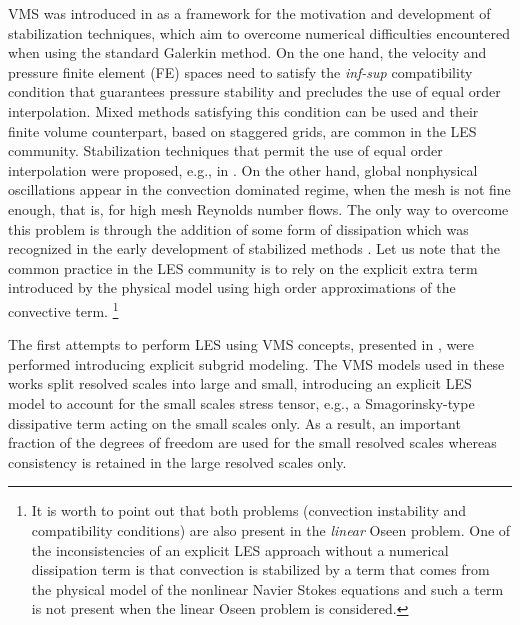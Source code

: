 VMS was introduced in \cite{hughes_multiscale_1995,hughes_variational_1998} as a framework for the motivation and development of stabilization techniques, which aim to overcome numerical difficulties encountered when using the standard Galerkin method. On the one hand, the velocity and pressure finite element (FE) spaces need to satisfy the \textit{inf-sup} compatibility condition that guarantees pressure stability and precludes the use of equal order interpolation. Mixed methods satisfying this condition can be used and their finite volume counterpart, based on staggered grids, are common in the LES community. Stabilization techniques that permit the use of equal order interpolation were proposed, e.g., in \cite{douglas_absolutely_1989,hughes_new_1986}. %
On the other hand, global nonphysical oscillations appear in the convection dominated regime, when the mesh is not fine enough, that is, for high mesh Reynolds number flows. The only way to overcome this problem is through the addition of some form of dissipation which was recognized in the early development of stabilized methods \cite{brooks_streamline_1982}. Let us note that  the common practice in the LES community is to rely on the explicit extra term introduced by the physical model using high order approximations of the convective term.
\footnote{It is worth to point out that both problems (convection instability and compatibility conditions) are also present in the \textit{linear} Oseen problem. One of the inconsistencies of an explicit LES approach without a numerical dissipation term is that convection is stabilized by a term that comes from the physical model of the nonlinear Navier Stokes equations and such a term is not present when the linear Oseen problem is considered.} 

The first attempts to perform LES using VMS concepts, presented in \cite{hughes_large_2000,hughes_large_2001,hughes_multiscale_2001,koobus_variational_2004,john_variants_2008},  were performed introducing explicit subgrid modeling. The VMS models used in these works split resolved scales into large and small, introducing an explicit LES model to account for the small scales stress tensor, e.g., a Smagorinsky-type dissipative term acting on the small scales only. As a result, an important fraction of the degrees of freedom are used for the small resolved scales whereas consistency is retained in the large resolved scales only. 

